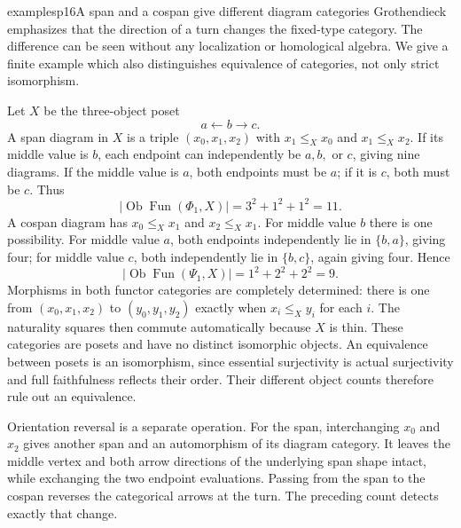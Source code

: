 \begin{dcomment}{examples}{p16}{A span and a cospan give different diagram categories}
Grothendieck emphasizes that the direction of a turn changes the fixed-type category. The difference can be seen without any localization or homological algebra. We give a finite example which also distinguishes equivalence of categories, not only strict isomorphism.

Let $X$ be the three-object poset
\[
             a\longleftarrow b\longrightarrow c.
\]
A span diagram in $X$ is a triple $(x_0,x_1,x_2)$ with $x_1\leq_X x_0$ and $x_1\leq_X x_2$. If its middle value is $b$, each endpoint can independently be $a,b,$ or $c$, giving nine diagrams. If the middle value is $a$, both endpoints must be $a$; if it is $c$, both must be $c$. Thus
\[
 \bigl|\operatorname{Ob}\operatorname{Fun}(\Phi_1,X)\bigr|
 =3^2+1^2+1^2=11.
\]
A cospan diagram has $x_0\leq_X x_1$ and $x_2\leq_X x_1$. For middle value $b$ there is one possibility. For middle value $a$, both endpoints independently lie in $\{b,a\}$, giving four; for middle value $c$, both independently lie in $\{b,c\}$, again giving four. Hence
\[
 \bigl|\operatorname{Ob}\operatorname{Fun}(\Psi_1,X)\bigr|
 =1^2+2^2+2^2=9.
\]
Morphisms in both functor categories are completely determined: there is one from $(x_0,x_1,x_2)$ to $(y_0,y_1,y_2)$ exactly when $x_i\leq_Xy_i$ for each $i$. The naturality squares then commute automatically because $X$ is thin. These categories are posets and have no distinct isomorphic objects. An equivalence between posets is an isomorphism, since essential surjectivity is actual surjectivity and full faithfulness reflects their order. Their different object counts therefore rule out an equivalence.

Orientation reversal is a separate operation. For the span, interchanging $x_0$ and $x_2$ gives another span and an automorphism of its diagram category. It leaves the middle vertex and both arrow directions of the underlying span shape intact, while exchanging the two endpoint evaluations. Passing from the span to the cospan reverses the categorical arrows at the turn. The preceding count detects exactly that change.
\end{dcomment}

